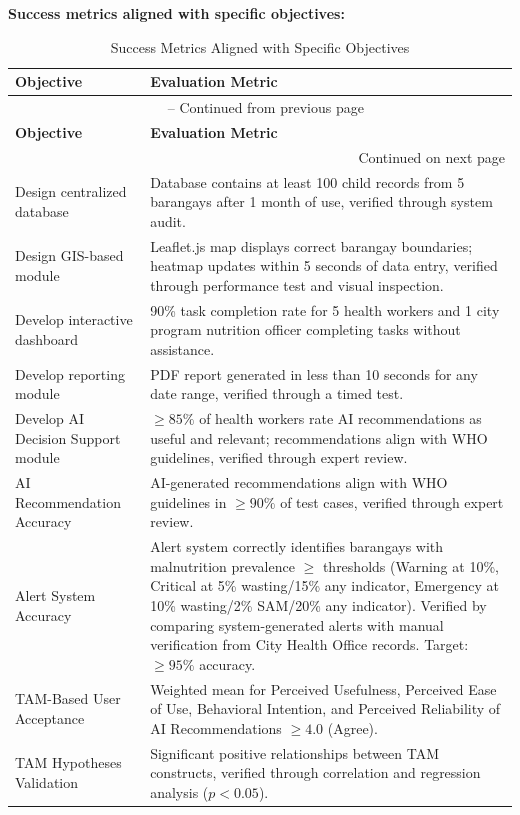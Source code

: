 \documentclass[12pt, a4paper]{report}
\begin{document}
\noindent \textbf{Success metrics aligned with specific objectives:}

\vspace{0.3cm}
\begin{longtable}{p{4cm} p{10cm}}
    \caption{Success Metrics Aligned with Specific Objectives} \label{tab:success_metrics} \\
    \toprule
    \textbf{Objective} & \textbf{Evaluation Metric} \\
    \midrule
    \endfirsthead
    \multicolumn{2}{c}{{\tablename\ \thetable{} -- Continued from previous page}} \\
    \toprule
    \textbf{Objective} & \textbf{Evaluation Metric} \\
    \midrule
    \endhead
    \midrule
    \multicolumn{2}{r}{{Continued on next page}} \\
    \endfoot
    \bottomrule
    \endlastfoot
    Design centralized database & Database contains at least 100 child records from 5 barangays after 1 month of use, verified through system audit. \\
    \addlinespace
    Design GIS-based module & Leaflet.js map displays correct barangay boundaries; heatmap updates within 5 seconds of data entry, verified through performance test and visual inspection. \\
    \addlinespace
    Develop interactive dashboard & 90\% task completion rate for 5 health workers and 1 city program nutrition officer completing tasks without assistance. \\
    \addlinespace
    Develop reporting module & PDF report generated in less than 10 seconds for any date range, verified through a timed test. \\
    \addlinespace
    Develop AI Decision Support module & \(\geq 85\%\) of health workers rate AI recommendations as useful and relevant; recommendations align with WHO guidelines, verified through expert review. \\
    \addlinespace
    AI Recommendation Accuracy & AI-generated recommendations align with WHO guidelines in \(\geq 90\%\) of test cases, verified through expert review. \\
    \addlinespace
    Alert System Accuracy & Alert system correctly identifies barangays with malnutrition prevalence \(\geq\) thresholds (Warning at 10\%, Critical at 5\% wasting/15\% any indicator, Emergency at 10\% wasting/2\% SAM/20\% any indicator). Verified by comparing system-generated alerts with manual verification from City Health Office records. Target: \(\geq 95\%\) accuracy. \\
    \addlinespace
    TAM-Based User Acceptance & Weighted mean for Perceived Usefulness, Perceived Ease of Use, Behavioral Intention, and Perceived Reliability of AI Recommendations \(\geq 4.0\) (Agree). \\
    \addlinespace
    TAM Hypotheses Validation & Significant positive relationships between TAM constructs, verified through correlation and regression analysis (\(p < 0.05\)). \\
\end{longtable}
\vspace{0.3cm}
\end{document}
